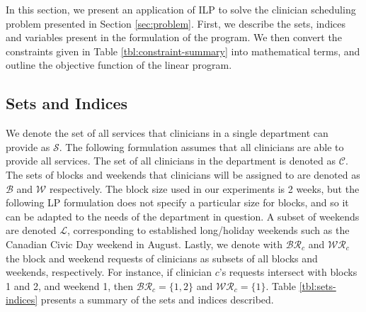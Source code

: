 In this section, we present an application of ILP to solve the clinician scheduling problem presented in Section \ref{sec:problem}. First, we describe the sets, indices and variables present in the formulation of the program. We then convert the constraints given in Table \ref{tbl:constraint-summary} into mathematical terms, and outline the objective function of the linear program.

\subsection{Sets and Indices} \label{sec:meth-sets-indices}
We denote the set of all services %
that clinicians in a single department can provide as $\mathcal{S}$. The following formulation assumes that all clinicians are able to provide all services. The set of all clinicians in the department is denoted as $\mathcal{C}$. The sets of blocks and weekends that clinicians will be assigned to are denoted as $\mathcal{B}$ and $\mathcal{W}$ respectively. The block size used in our experiments is 2 weeks, but the following LP formulation does not specify a particular size for blocks, and so it can be adapted to the needs of the department in question.
A subset of weekends are denoted $\mathcal{L}$, corresponding to established long/holiday weekends such as the Canadian Civic Day weekend in August. Lastly, we denote with $\mathcal{BR}_c$ and $\mathcal{WR}_c$ the block and weekend requests of clinicians as subsets of all blocks and weekends, respectively. For instance, if clinician $c$'s requests intersect with blocks 1 and 2, and weekend 1, then $\mathcal{BR}_c = \{1, 2\}$ and $\mathcal{WR}_c = \{1\}$. Table \ref{tbl:sets-indices} presents a summary of the sets and indices described. 

